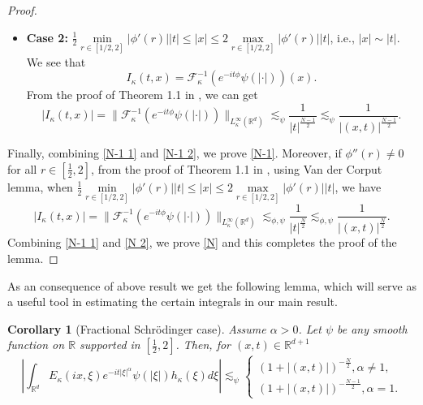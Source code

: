 \documentclass[a4paper,11pt, reqno]{amsart}
\newtheorem{cor}[theorem]{Corollary}
\theoremstyle{definition}
\theoremstyle{remark}
\numberwithin{equation}{section}
\begin{document}
\begin{proof}
\begin{itemize}
			For any $M\in\mathbb{N}$, by repeated integration by parts $M$-times and \eqref{big-s}, we obtain 
			\begin{equation*}
				\left|\int_0^\infty e^{i\left(\pm r|x|-t\phi(r)\right)}\psi(r)H(r|x|)r^{N-1}dr\right|\lesssim_{\phi,\psi,M} \frac{1}{|(x,t)|^M}.
			\end{equation*}
			Therefore
			\begin{equation}\label{N-1 1}
				\left|I_\kappa(t, x)\right|\lesssim_{\phi,\psi,M} \frac{1}{|(x,t)|^M}.
			\end{equation}
			\item \textbf{Case 2:}  $\frac{1}{2}\min\limits_{r\in[1/2,2]}|\phi'(r)||t|\leq |x|\leq 2\max\limits_{r\in[1/2,2]}|\phi'(r)||t|$, i.e., $|x|\sim|t|$. We see that 
			\begin{equation*}
				I_\kappa(t, x)=\mathcal{F}^{-1}_\kappa (e^{-it\phi} \psi(|\cdot|))(x).
			\end{equation*}
			From the proof of Theorem 1.1 in \cite{LMS}, we can get
			\begin{equation}\label{N-1 2}
				\left|I_\kappa(t, x)\right|=\|\mathcal{F}^{-1}_\kappa (e^{-it\phi} \psi(|\cdot|))\|_{L_\kappa^\infty(\mathbb{R}^{d})} \lesssim_{\psi} \frac{1}{|t|^\frac{N-1}{2}}\lesssim_{\psi}  \frac{1}{|(x,t)|^\frac{N-1}{2}}.
			\end{equation}
			
		\end{itemize}
        Finally, combining \eqref{N-1 1} and \eqref{N-1 2}, we prove \eqref{N-1}. Moreover, if $\phi''(r)\neq0$ for all $r\in [\frac{1}{2},2]$, from the proof of Theorem 1.1 in \cite{LMS}, using Van der Corput lemma, when $\frac{1}{2}\min\limits_{r\in[1/2,2]}|\phi'(r)||t|\leq |x|\leq 2\max\limits_{r\in[1/2,2]}|\phi'(r)||t|$, we have
		\begin{equation}\label{N 2}
			\left|I_\kappa(t, x)\right|=\|\mathcal{F}^{-1}_\kappa (e^{-it\phi} \psi(|\cdot|))\|_{L_\kappa^\infty(\mathbb{R}^{d})} \lesssim_{\phi,\psi} \frac{1}{|t|^\frac{N}{2}}\lesssim_{\phi,\psi}  \frac{1}{|(x,t)|^\frac{N}{2}}.
		\end{equation}
		Combining \eqref{N-1 1} and \eqref{N 2}, we prove \eqref{N}  and this completes the proof of the lemma.
	\end{proof}

As an consequence of above result we get the following lemma, which will serve as a useful tool in estimating the certain integrals in our main result.

\begin{cor}[Fractional Schr\"odinger case]\label{fractional}
			Assume $\alpha>0$. Let  $\psi$ be any smooth function on $\mathbb{R}$ supported in $[\frac{1}{2},2]$. Then, for $(x, t) \in \mathbb{R}^{d+1}$
			$$
			\left|\int_{\mathbb{R}^{d}} E_{\kappa}(ix, \xi) e^{-i t|\xi|^\alpha} \psi(|\xi|) h_\kappa(\xi)  d \xi\right| \lesssim_\psi\begin{cases}(1+|(x, t)|)^{-\frac{N}{2}},\alpha\neq1,\\
				(1+|(x, t)|)^{-\frac{N-1}{2}},\alpha=1.
			\end{cases}
			$$
	\end{cor}
    
\end{document}
